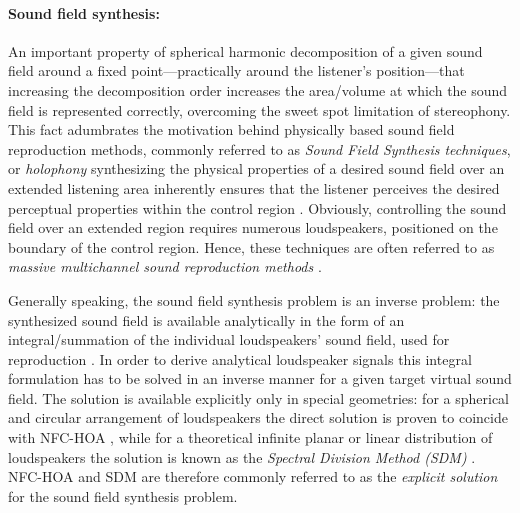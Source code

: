 \paragraph{Sound field synthesis:}
An important property of spherical harmonic decomposition of a given sound field around a fixed point---practically around the listener's position---that increasing the decomposition order increases the area/volume at which the sound field is represented correctly, overcoming the sweet spot limitation of stereophony.
This fact adumbrates the motivation behind physically based sound field reproduction methods, commonly referred to as \emph{Sound Field Synthesis techniques}, or \emph{holophony} synthesizing the physical properties of a desired sound field over an extended listening area inherently ensures that the listener perceives the desired perceptual properties within the control region \cite{Spors2013:Survey}.
Obviously, controlling the sound field over an extended region requires numerous loudspeakers, positioned on the boundary of the control region.
Hence, these techniques are often referred to as \emph{massive multichannel sound reproduction methods} \cite{Spors2013:Survey, Zhang2017}.

Generally speaking, the sound field synthesis problem is an inverse problem: the synthesized sound field is available analytically in the form of an integral/summation of the individual loudspeakers' sound field, used for reproduction \cite{Ahrens2010phd, Ahrens2012, fazi2008surround, Fazi2010}.
In order to derive analytical loudspeaker signals this integral formulation has to be solved in an inverse manner for a given target virtual sound field.
The solution is available explicitly only in special geometries: for a spherical and circular arrangement of loudspeakers the direct solution is proven to coincide with NFC-HOA \cite{Daniel2003, fazi2008surround, Fazi2010, poletti2005three, 943347, Ahrens2008:Analytical_Circ_Spherical_SFS, Ahrens2011:icassp}, while for a theoretical infinite planar or linear distribution of loudspeakers the solution is known as the \emph{Spectral Division Method (SDM)} \cite{Ahrens2010a, Ahrens2012:Ambisonics_for_planar_linear, Ahrens2012}.
NFC-HOA and SDM are therefore commonly referred to as the \emph{explicit solution} for the sound field synthesis problem.

